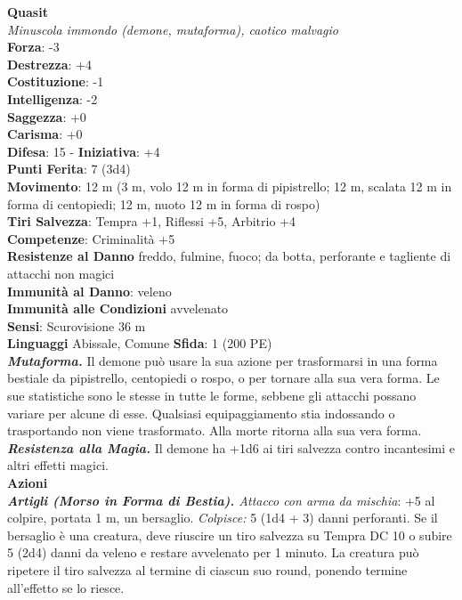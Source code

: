 \begin{multicols}{2}
\medskip\textbf{Quasit}\\
\emph{Minuscola immondo (demone, mutaforma), caotico malvagio}\\
\textbf{Forza}: -3\\
\textbf{Destrezza}: +4\\
\textbf{Costituzione}: -1\\
\textbf{Intelligenza}: -2\\
\textbf{Saggezza}: +0\\
\textbf{Carisma}: +0\\
\textbf{Difesa}: 15 - \textbf{Iniziativa}: +4\\
\textbf{Punti Ferita}: 7 (3d4)\\
\textbf{Movimento}: 12 m (3 m, volo 12 m in forma di pipistrello; 12 m,
scalata 12 m in forma di centopiedi; 12 m, nuoto 12 m in forma di rospo)\\
\textbf{Tiri Salvezza}: Tempra +1, Riflessi +5, Arbitrio +4\\
\textbf{Competenze}: Criminalità +5\\
\textbf{Resistenze al Danno} freddo, fulmine, fuoco; da botta, perforante e tagliente di attacchi non magici\\
\textbf{Immunità al Danno}: veleno\\
\textbf{Immunità alle Condizioni} avvelenato\\
\textbf{Sensi}: Scurovisione 36 m \\
\textbf{Linguaggi} Abissale, Comune 
\textbf{Sfida}: 1 (200 PE)\smallskip\\
\emph{\textbf{Mutaforma.}} Il demone può usare la sua azione per trasformarsi in una forma bestiale da pipistrello, centopiedi o rospo, o per tornare alla sua vera forma. Le sue statistiche sono le stesse in tutte le forme, sebbene gli attacchi possano variare per alcune di esse. Qualsiasi equipaggiamento stia indossando o trasportando non viene trasformato. Alla morte ritorna alla sua vera forma.\\
\emph{\textbf{Resistenza alla Magia.}} Il demone ha +1d6 ai tiri salvezza contro incantesimi e altri effetti magici.\\
\smallskip\textbf{Azioni}\\
\emph{\textbf{Artigli (Morso in Forma di Bestia).} Attacco con arma da mischia}: +5 al colpire, portata 1 m, un bersaglio. \emph{Colpisce:} 5 (1d4 + 3) danni perforanti. Se il bersaglio è una creatura, deve riuscire un tiro salvezza su Tempra DC 10 o subire 5 (2d4) danni da veleno e restare avvelenato per 1 minuto. La creatura può ripetere il tiro salvezza al termine di ciascun suo round, ponendo termine all'effetto se lo riesce.\\

\end{multicols}
